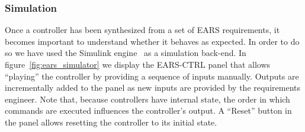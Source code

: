 \subsubsection{Simulation}
Once a controller has been synthesized from a set of EARS requirements, it
becomes important to understand whether it behaves as expected. In order to do
so we have used the Simulink engine~\cite{simulink} as a simulation back-end.
In figure~\ref{fig:ears_simulator} we display the \textsf{EARS-CTRL} panel that
allows ``playing'' the controller by providing a sequence of inputs manually.
Outputs are incrementally added to the panel as new inputs are provided by the
requirements engineer. Note that, because controllers have internal state,
the order in which commands are executed influences the controller's output. A
``Reset'' button in the panel allows resetting the controller to its initial
state.
\vspace{-.4cm}
